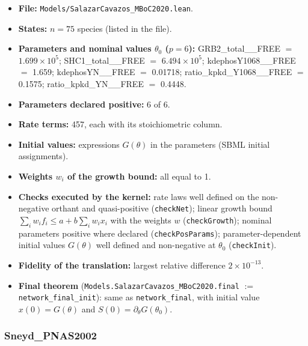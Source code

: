 \begin{itemize}\itemsep0pt\small
\item \textbf{File:} \texttt{Models/SalazarCavazos\_MBoC2020.lean}.
\item \textbf{States:} $n=75$ species (listed in the file).
\item \textbf{Parameters and nominal values $\theta_0$ ($p=6$):} GRB2\_total\_\_FREE $=$ $1.699\times10^{5}$; SHC1\_total\_\_FREE $=$ $6.494\times10^{5}$; kdephosY1068\_\_FREE $=$ 1.659; kdephosYN\_\_FREE $=$ 0.01718; ratio\_kpkd\_Y1068\_\_FREE $=$ 0.1575; ratio\_kpkd\_YN\_\_FREE $=$ 0.4448.
\item \textbf{Parameters declared positive:} 6 of 6.
\item \textbf{Rate terms:} 457, each with its stoichiometric column.
\item \textbf{Initial values:} expressions $G(\theta)$ in the parameters (SBML initial assignments).
\item \textbf{Weights $w_i$ of the growth bound:} all equal to 1.
\item \textbf{Checks executed by the kernel:} rate laws well defined on the non-negative orthant and quasi-positive (\texttt{checkNet}); linear growth bound $\sum_iw_if_i\le a+b\sum_iw_ix_i$ with the weights $w$ (\texttt{checkGrowth}); nominal parameters positive where declared (\texttt{checkPosParams}); parameter-dependent initial values $G(\theta)$ well defined and non-negative at $\theta_0$ (\texttt{checkInit}).
\item \textbf{Fidelity of the translation:} largest relative difference $2\times10^{-13}$.
\item \textbf{Final theorem} (\texttt{Models.SalazarCavazos\_MBoC2020.final} $:=$ \texttt{network\_final\_init}): same as \texttt{network\_final}, with initial value $x(0)=G(\theta)$ and $S(0)=\partial_\theta G(\theta_0)$.
\end{itemize}

\subsubsection*{Sneyd\_PNAS2002}

